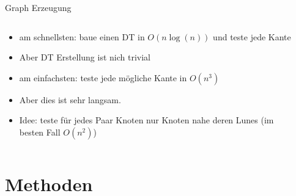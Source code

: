 \documentclass{beamer}
\begin{document}
        \begin{frame}{Graph Erzeugung}
            \begin{columns}[t]
                \begin{column}{5cm}
                    \begin{itemize}
                        \item<1-> am schnellsten: baue einen DT in \(O(n \log(n))\) und teste jede Kante
                        \item<2-> Aber DT Erstellung ist nich trivial
                        \item<3-> am einfachsten: teste jede mögliche Kante in \(O(n^{3})\)
                        \item<4-> Aber dies ist sehr langsam.
                        \item<5-> Idee: teste für jedes Paar Knoten nur Knoten nahe deren Lunes (im besten Fall \(O(n^{2})\))
                    \end{itemize}
                \end{column}
                \begin{column}{5cm}
                    \begin{overprint}
                    \end{overprint}
                \end{column}
            \end{columns}
        \end{frame}

\section{Methoden}
\end{document}
